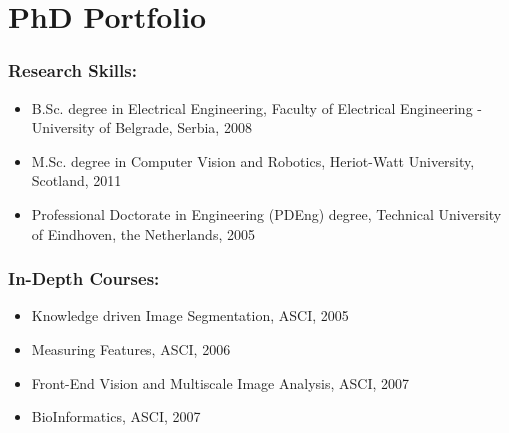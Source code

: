 %
%

\noquote
\orgchpos
\chapter*{PhD Portfolio}

\noindent

\subsection*{Research Skills:}
\vspace{1ex}
\begin{itemize}
	\item B.Sc. degree in Electrical Engineering, Faculty of Electrical Engineering - University of Belgrade, Serbia, 2008
	\item M.Sc. degree in Computer Vision and Robotics, Heriot-Watt University, Scotland, 2011
	\item Professional Doctorate in Engineering (PDEng) degree, Technical
University of Eindhoven, the Netherlands, 2005
\end{itemize}

\subsection*{In-Depth Courses:}
\vspace{1ex}
\begin{itemize}
\item Knowledge driven Image Segmentation, ASCI, 2005
\item Measuring Features, ASCI, 2006
\item Front-End Vision and Multiscale Image Analysis, ASCI, 2007
\item BioInformatics, ASCI, 2007
\end{itemize}

